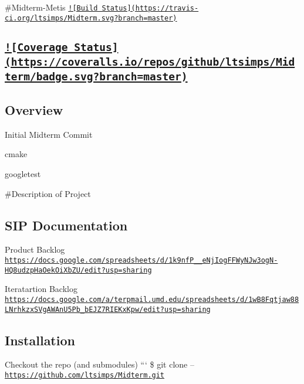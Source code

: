\#\-Midterm-\/\-Metis \href{https://travis-ci.org/ltsimps/Midterm}{\tt !\mbox{[}Build Status\mbox{]}(https\-://travis-\/ci.\-org/ltsimps/\-Midterm.\-svg?branch=master)}

\subsection*{\href{https://coveralls.io/github/ltsimps/Midterm?branch=master}{\tt !\mbox{[}Coverage Status\mbox{]}(https\-://coveralls.\-io/repos/github/ltsimps/\-Midterm/badge.\-svg?branch=master)} }

\subsection*{Overview}

Initial Midterm Commit
\begin{DoxyItemize}
\item cmake
\item googletest
\end{DoxyItemize}

\#\-Description of Project

\subsection*{S\-I\-P Documentation}


\begin{DoxyItemize}
\item Product Backlog \href{https://docs.google.com/spreadsheets/d/1k9nfP__eNjIogFFWyNJw3ogN-HQ8udzpHaOekOiXbZU/edit?usp=sharing}{\tt https\-://docs.\-google.\-com/spreadsheets/d/1k9nf\-P\-\_\-\-\_\-e\-Nj\-Iog\-F\-F\-Wy\-N\-Jw3og\-N-\/\-H\-Q8udzp\-Ha\-Oek\-Oi\-Xb\-Z\-U/edit?usp=sharing}
\item Iteratartion Backlog \href{https://docs.google.com/a/terpmail.umd.edu/spreadsheets/d/1wB8Fqtjaw88LNrhkzxSVgAWAnU5Pb_bEJZ7RIEKxKpw/edit?usp=sharing}{\tt https\-://docs.\-google.\-com/a/terpmail.\-umd.\-edu/spreadsheets/d/1w\-B8\-Fqtjaw88\-L\-Nrhkzx\-S\-Vg\-A\-W\-An\-U5\-Pb\-\_\-b\-E\-J\-Z7\-R\-I\-E\-Kx\-Kpw/edit?usp=sharing}
\end{DoxyItemize}

\subsection*{Installation}


\begin{DoxyItemize}
\item Checkout the repo (and submodules) ``` \$ git clone --\href{https://github.com/ltsimps/Midterm.git}{\tt https\-://github.\-com/ltsimps/\-Midterm.\-git}
\end{DoxyItemize}

